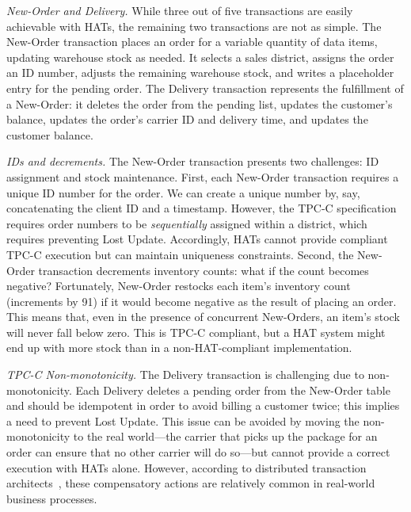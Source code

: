 \vspace{.5em}\noindent\textit{New-Order and Delivery.} While three out of
five transactions are easily achievable with HATs, the remaining two
transactions are not as simple. The New-Order transaction places an
order for a variable quantity of data items, updating warehouse stock
as needed. It selects a sales district, assigns the order an ID
number, adjusts the remaining warehouse stock, and writes a
placeholder entry for the pending order. The Delivery transaction
represents the fulfillment of a New-Order: it deletes the order from
the pending list, updates the customer's balance, updates the order's
carrier ID and delivery time, and updates the customer balance.

\vspace{.5em}\noindent\textit{IDs and decrements.} The New-Order transaction presents two challenges: ID assignment and
stock maintenance. First, each New-Order transaction requires a unique
ID number for the order. We can create a unique number by, say,
concatenating the client ID and a timestamp. However, the TPC-C
specification requires order numbers to be \textit{sequentially}
assigned within a district, which requires preventing Lost
Update. Accordingly, HATs cannot provide compliant TPC-C execution but
can maintain uniqueness constraints. Second, the New-Order
transaction decrements inventory counts: what if the count becomes
negative?  Fortunately, New-Order restocks each item's inventory
count (increments by 91) if it would become negative as the result of
placing an order. This means that, even in the presence of concurrent
New-Orders, an item's stock will never fall below zero. This is TPC-C
compliant, but a HAT system might end up with more stock than in a
non-HAT-compliant implementation.

\vspace{.5em}\noindent\textit{TPC-C Non-monotonicity.} The Delivery
transaction is challenging due to non-monotonicity. Each Delivery
deletes a pending order from the New-Order table and should be
idempotent in order to avoid billing a customer twice; this implies a
need to prevent Lost Update. This issue can be avoided by moving the
non-monotonicity to the real world---the carrier that picks up the
package for an order can ensure that no other carrier will do so---but
cannot provide a correct execution with HATs alone. However, according
to distributed transaction architects~\cite{entitygroup}, these
compensatory actions are relatively common in real-world business
processes.

